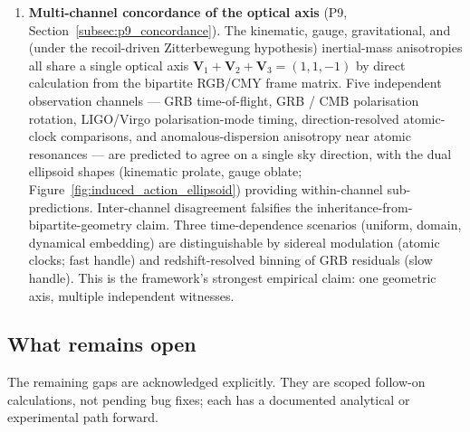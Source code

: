\begin{enumerate}
\item \textbf{Multi-channel concordance of the optical axis}
(P9, Section~\ref{subsec:p9_concordance}).
The kinematic, gauge, gravitational, and (under the recoil-driven
Zitterbewegung hypothesis) inertial-mass anisotropies all share a
single optical axis
$\mathbf{V}_1+\mathbf{V}_2+\mathbf{V}_3 = (1,1,-1)$ by direct
calculation from the bipartite RGB/CMY frame matrix.  Five
independent observation channels --- GRB time-of-flight, GRB / CMB
polarisation rotation, LIGO/Virgo polarisation-mode timing,
direction-resolved atomic-clock comparisons, and anomalous-dispersion
anisotropy near atomic resonances --- are predicted to agree on a
single sky direction, with the dual ellipsoid shapes (kinematic
prolate, gauge oblate;
Figure~\ref{fig:induced_action_ellipsoid}) providing within-channel
sub-predictions.  Inter-channel disagreement falsifies the
inheritance-from-bipartite-geometry claim.  Three time-dependence
scenarios (uniform, domain, dynamical embedding) are distinguishable
by sidereal modulation (atomic clocks; fast handle) and
redshift-resolved binning of GRB residuals (slow handle).  This is
the framework's strongest empirical claim: one geometric axis,
multiple independent witnesses.

\end{enumerate}

\subsection*{What remains open}

The remaining gaps are acknowledged explicitly.  They are scoped
follow-on calculations, not pending bug fixes; each has a documented
analytical or experimental path forward.

